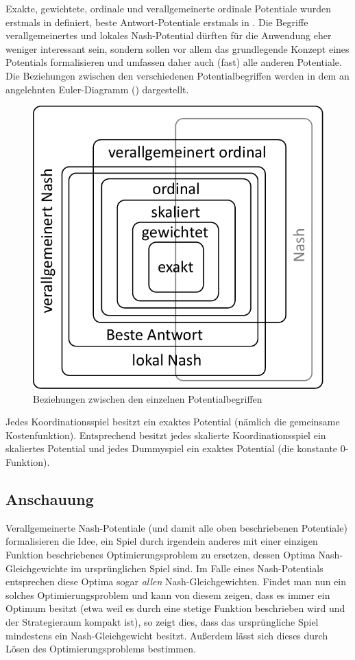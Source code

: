 Exakte, gewichtete, ordinale und verallgemeinerte ordinale Potentiale wurden erstmals in \cite{MonShap} definiert, beste Antwort-Potentiale erstmals in \cite{BestRespPot}. Die Begriffe verallgemeinertes und lokales Nash-Potential dürften für die Anwendung eher weniger interessant sein, sondern sollen vor allem das grundlegende Konzept eines Potentials formalisieren und umfassen daher auch (fast) alle anderen Potentiale. Die Beziehungen zwischen den verschiedenen Potentialbegriffen werden in dem an \cite[Abbildung 1]{BestRespPot} angelehnten Euler-Diagramm () dargestellt.

\begin{figure}[ht]\centering
	\includegraphics[width=.4\textwidth]{../Bilder/EulerDiagPotentiale.pdf}
	\caption{Beziehungen zwischen den einzelnen Potentialbegriffen}\label{diag:Potentiale}
\end{figure}

\begin{bsp}
	Jedes Koordinationsspiel besitzt ein exaktes Potential (nämlich die gemeinsame Kostenfunktion). Entsprechend besitzt jedes skalierte Koordinationsspiel ein skaliertes Potential und jedes Dummyspiel ein exaktes Potential (die konstante $0$-Funktion).
\end{bsp}

\subsection{Anschauung}

Verallgemeinerte Nash-Potentiale (und damit alle oben beschriebenen Potentiale) formalisieren die Idee, ein Spiel durch irgendein anderes mit einer einzigen Funktion beschriebenes Optimierungsproblem zu ersetzen, dessen Optima Nash-Gleichgewichte im ursprünglichen Spiel sind. Im Falle eines Nash-Potentials entsprechen diese Optima sogar \emph{allen} Nash-Gleichgewichten. Findet man nun ein solches Optimierungsproblem und kann von diesem zeigen, dass es immer ein Optimum besitzt (etwa weil es durch eine stetige Funktion beschrieben wird und der Strategieraum kompakt ist), so zeigt dies, dass das ursprüngliche Spiel mindestens ein Nash-Gleichgewicht besitzt. Außerdem lässt sich dieses durch Lösen des Optimierungsproblems bestimmen.

